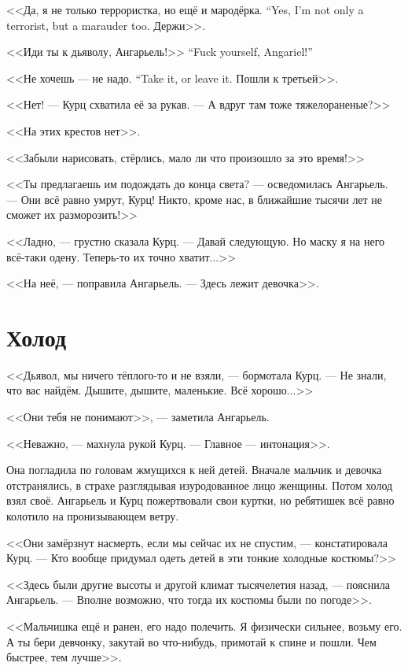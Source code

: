{<<Да, я не только террористка, но ещё и мародёрка.}
{``Yes, I'm not only a terrorist, but a marauder too.}
Держи>>.

{<<Иди ты к дьяволу, Ангарьель!>>}
{``Fuck yourself, Angariel!''}

{<<Не хочешь --- не надо.}
{``Take it, or leave it.}
Пошли к третьей>>.

<<Нет! --- Курц схватила её за рукав.
--- А вдруг там тоже тяжелораненые?>>

<<На этих крестов нет>>.

<<Забыли нарисовать, стёрлись, мало ли что произошло за это время!>>

<<Ты предлагаешь им подождать до конца света? --- осведомилась Ангарьель.
--- Они всё равно умрут, Курц!
Никто, кроме нас, в ближайшие тысячи лет не сможет их разморозить!>>

<<Ладно, --- грустно сказала Курц.
--- Давай следующую.
Но маску я на него всё-таки одену.
Теперь-то их точно хватит...>>

<<На неё, --- поправила Ангарьель.
--- Здесь лежит девочка>>.

\section{Холод}

<<Дьявол, мы ничего тёплого-то и не взяли, --- бормотала Курц.
--- Не знали, что вас найдём.
Дышите, дышите, маленькие.
Всё хорошо...>>

<<Они тебя не понимают>>, --- заметила Ангарьель.

<<Неважно, --- махнула рукой Курц.
--- Главное --- интонация>>.

Она погладила по головам жмущихся к ней детей.
Вначале мальчик и девочка отстранялись, в страхе разглядывая изуродованное лицо женщины.
Потом холод взял своё.
Ангарьель и Курц пожертвовали свои куртки, но ребятишек всё равно колотило на пронизывающем ветру.

<<Они замёрзнут насмерть, если мы сейчас их не спустим, --- констатировала Курц.
--- Кто вообще придумал одеть детей в эти тонкие холодные костюмы?>>

<<Здесь были другие высоты и другой климат тысячелетия назад, --- пояснила Ангарьель.
--- Вполне возможно, что тогда их костюмы были по погоде>>.

<<Мальчишка ещё и ранен, его надо полечить.
Я физически сильнее, возьму его.
А ты бери девчонку, закутай во что-нибудь, примотай к спине и пошли.
Чем быстрее, тем лучше>>.

